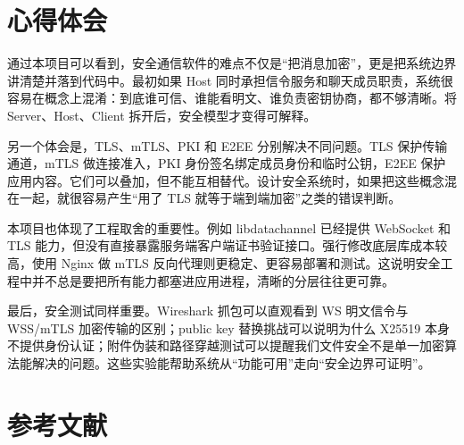 \documentclass[UTF8,a4paper,12pt]{ctexart}
\begin{document}
\section{心得体会}

通过本项目可以看到，安全通信软件的难点不仅是“把消息加密”，更是把系统边界讲清楚并落到代码中。最初如果 Host 同时承担信令服务和聊天成员职责，系统很容易在概念上混淆：到底谁可信、谁能看明文、谁负责密钥协商，都不够清晰。将 Server、Host、Client 拆开后，安全模型才变得可解释。

另一个体会是，TLS、mTLS、PKI 和 E2EE 分别解决不同问题。TLS 保护传输通道，mTLS 做连接准入，PKI 身份签名绑定成员身份和临时公钥，E2EE 保护应用内容。它们可以叠加，但不能互相替代。设计安全系统时，如果把这些概念混在一起，就很容易产生“用了 TLS 就等于端到端加密”之类的错误判断。

本项目也体现了工程取舍的重要性。例如 libdatachannel 已经提供 WebSocket 和 TLS 能力，但没有直接暴露服务端客户端证书验证接口。强行修改底层库成本较高，使用 Nginx 做 mTLS 反向代理则更稳定、更容易部署和测试。这说明安全工程中并不总是要把所有能力都塞进应用进程，清晰的分层往往更可靠。

最后，安全测试同样重要。Wireshark 抓包可以直观看到 WS 明文信令与 WSS/mTLS 加密传输的区别；public key 替换挑战可以说明为什么 X25519 本身不提供身份认证；附件伪装和路径穿越测试可以提醒我们文件安全不是单一加密算法能解决的问题。这些实验能帮助系统从“功能可用”走向“安全边界可证明”。

\section{参考文献}
\end{document}
